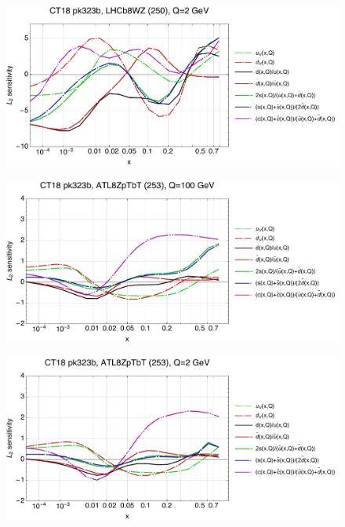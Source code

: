 \documentclass[10pt,aps,prd,floatfix,titlepage]{revtex4}
\begin{document}
\begin{figure}
\includegraphics[width=\textwidth,height=0.44\textheight,keepaspectratio]{2/250_ct18nn_q2_Sf_2.pdf}
\caption{}
\end{figure}
\clearpage
\begin{figure}
\includegraphics[width=\textwidth,height=0.44\textheight,keepaspectratio]{2/253_ct18nn_q100_Sf_2.pdf}
\caption{}
\end{figure}
\begin{figure}
\includegraphics[width=\textwidth,height=0.44\textheight,keepaspectratio]{2/253_ct18nn_q2_Sf_2.pdf}
\caption{}
\end{figure}
\end{document}

